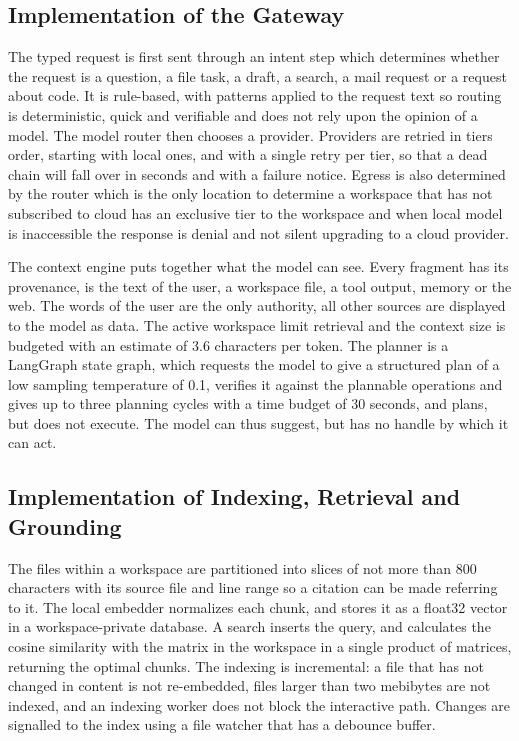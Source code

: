 \documentclass{FastFyp}
\begin{document}
\subsection{Implementation of the Gateway}
The typed request is first sent through an intent step which determines whether the request is a question, a file task, a draft, a search, a mail request or a request about code. It is rule-based, with patterns applied to the request text so routing is deterministic, quick and verifiable and does not rely upon the opinion of a model. The model router then chooses a provider. Providers are retried in tiers order, starting with local ones, and with a single retry per tier, so that a dead chain will fall over in seconds and with a failure notice. Egress is also determined by the router which is the only location to determine a workspace that has not subscribed to cloud has an exclusive tier to the workspace and when local model is inaccessible the response is denial and not silent upgrading to a cloud provider.

The context engine puts together what the model can see. Every fragment has its provenance, is the text of the user, a workspace file, a tool output, memory or the web. The words of the user are the only authority, all other sources are displayed to the model as data. The active workspace limit retrieval and the context size is budgeted with an estimate of 3.6 characters per token. The planner is a LangGraph state graph, which requests the model to give a structured plan of a low sampling temperature of 0.1, verifies it against the plannable operations and gives up to three planning cycles with a time budget of 30 seconds, and plans, but does not execute. The model can thus suggest, but has no handle by which it can act.

\subsection{Implementation of Indexing, Retrieval and Grounding}
The files within a workspace are partitioned into slices of not more than 800 characters with its source file and line range so a citation can be made referring to it. The local embedder normalizes each chunk, and stores it as a float32 vector in a workspace-private database. A search inserts the query, and calculates the cosine similarity with the matrix in the workspace in a single product of matrices, returning the optimal chunks. The indexing is incremental: a file that has not changed in content is not re-embedded, files larger than two mebibytes are not indexed, and an indexing worker does not block the interactive path. Changes are signalled to the index using a file watcher that has a debounce buffer.
\end{document}
